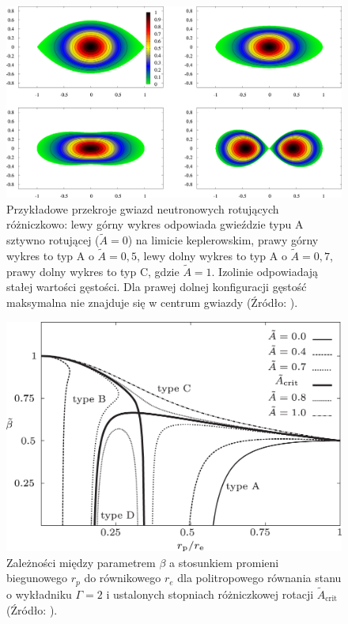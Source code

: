 \documentclass{bachelor_thesis}
\begin{document}
         \begin{figure}[h!]
            \centering
            \includegraphics[scale=.6]{figures/RysKszt.jpg}
            \caption{Przykładowe przekroje gwiazd neutronowych rotujących różniczkowo: lewy górny wykres odpowiada gwieździe typu A sztywno rotującej ($\tilde{A}=0$) na limicie keplerowskim, prawy górny wykres to typ A o $\tilde{A}=0,5$, lewy dolny wykres to typ A o $\tilde{A}=0,7$, prawy dolny wykres to typ C, gdzie $\tilde{A}=1$. Izolinie odpowiadają stałej wartości gęstości. Dla prawej dolnej konfiguracji gęstość maksymalna nie znajduje się w centrum gwiazdy (Źródło: \citealp{Rosinska2017}).}
            \label{RysKszt}
        \end{figure}
        \begin{figure}[h!]
            \centering
            \includegraphics[scale=1.5]{figures/RysTypy.jpg}
            \caption{Zależności między parametrem $\beta$ a stosunkiem promieni biegunowego $r_p$ do równikowego $r_e$ dla politropowego równania stanu o wykładniku $\Gamma=2$ i ustalonych stopniach różniczkowej rotacji $\tilde{A}_{\textrm{crit}}$ (Źródło: \citealp{Ansorg2009}).}
            \label{RysTypy}
        \end{figure}
\end{document}
